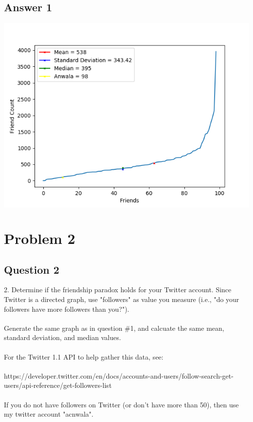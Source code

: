 \documentclass[10pt,letterpaper]{article}
\begin{document}
\subsection{Answer 1}
\includegraphics[scale=1]{Question1.png} 
\pagebreak 

\section{Problem 2}
\subsection{Question 2}
2.  Determine if the friendship paradox holds for your Twitter account.
Since Twitter is a directed graph, use "followers" as value you measure
(i.e., "do your followers have more followers than you?").\\
\\
Generate the same graph as in question \#1, and calcuate the same 
mean, standard deviation, and median values.\\
\\
For the Twitter 1.1 API to help gather this data, see:\\
\\
https://developer.twitter.com/en/docs/accounts-and-users/follow-search-get-users/api-reference/get-followers-list\\
\\
If you do not have followers on Twitter (or don't have more than 50),
then use my twitter account "acnwala".\\
\\
\end{document}
